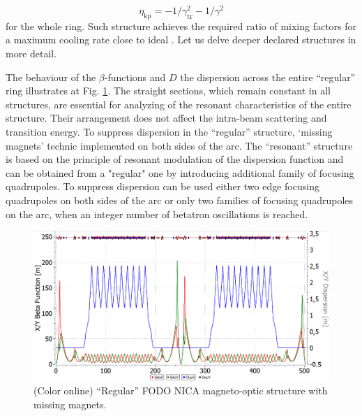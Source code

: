 \documentclass[submitting]{nst}
\begin{document}
\begin{equation}
\eta_{\textrm{kp}}=-1/\gamma_{\textrm{tr}}^2-1/\gamma^2
\label{eq:eta_kp}
\end{equation}
\noindent for the whole ring. Such structure achieves the required ratio of mixing factors for a maximum cooling rate close to ideal \cite{b9}. Let us delve deeper declared structures in more detail.
\par The behaviour of the $\beta$-functions and $D$ the dispersion across the entire “regular” ring illustrates at Fig. \ref{fig:regular}. The straight sections, which remain constant in all structures, are essential for analyzing of the resonant characteristics of the entire structure. Their arrangement does not affect the intra-beam scattering and transition energy. To suppress dispersion in the “regular” structure, ‘missing magnets’ technic implemented on both sides of the arc.
\noindent The “resonant” structure is based on the principle of resonant modulation of the dispersion function and can be obtained from a "regular" one by introducing additional family of focusing quadrupoles. To suppress dispersion can be used either two edge focusing quadrupoles on both sides of the arc or only two families of focusing quadrupoles on the arc, when an integer number of betatron oscillations is reached.
\begin{figure}[!htb]
\includegraphics[width=\hsize]{fig3_regular.png}
\caption{(Color online) “Regular” FODO NICA magneto-optic structure with missing magnets.}
\label{fig:regular}
\end{figure}
\end{document}
